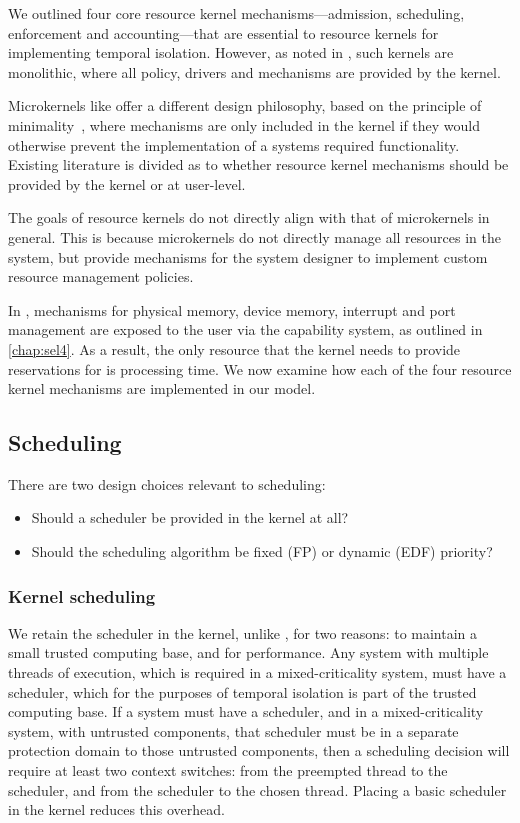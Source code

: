 We outlined four core resource kernel mechanisms---admission, scheduling, enforcement and
accounting---that are essential to resource kernels for implementing temporal isolation.  However,
as noted in , such kernels are monolithic, where all policy, drivers and
mechanisms are provided by the kernel.

Microkernels like \selfour offer a different design philosophy, based on the principle of
minimality~\citep{Liedtke_95}, where mechanisms are only included in the kernel if they would
otherwise prevent the implementation of a systems required functionality.  Existing literature is
divided as to whether resource kernel mechanisms should be provided by the kernel or at user-level.

The goals of resource kernels do not directly align with that of microkernels in general.  This is
because microkernels do not directly manage all resources in the system, but provide mechanisms for
the system designer to implement custom resource management policies.  

In \selfour, mechanisms for physical memory, device memory, interrupt and \IO port management are
exposed to the user via the capability system, as outlined in \cref{chap:sel4}. As a result, the
only resource that the kernel needs to provide reservations for is processing time.  We now examine
how each of the four resource kernel mechanisms are implemented in our model.

\subsection{Scheduling}

There are two design choices relevant to scheduling:

\begin{itemize} 
    \item Should a scheduler be provided in the kernel at all? 
    \item Should the scheduling algorithm be fixed (\gls{FP}) or dynamic (\gls{EDF}) priority?
\end{itemize}

\subsubsection{Kernel scheduling}

We retain the scheduler in the kernel, unlike \composite, for two reasons: to maintain a small
trusted computing base, and for performance. Any system with multiple threads of execution, which is
required in a mixed-criticality system, must have a scheduler, which for the purposes of temporal isolation 
is part of the trusted computing base. If a system must have a scheduler, and in a mixed-criticality
system, with untrusted components, that scheduler must be in a separate protection domain to those
untrusted components, then a scheduling decision will require at least two context switches: from
the preempted thread to the scheduler, and from the scheduler to the chosen thread. Placing a basic
scheduler in the kernel reduces this overhead. 

